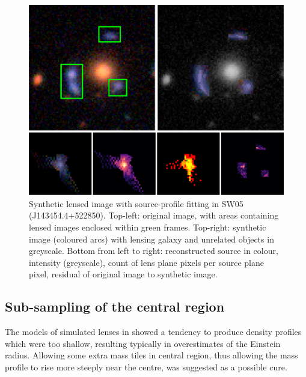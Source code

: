 \begin{figure}
  \includegraphics[width=\linewidth]{img/new_synth_img_detailed}
  \caption{Synthetic lensed image with source-profile fitting in SW05
    (J143454.4+522850). Top-left: original image, with areas
    containing lensed images enclosed within green frames.  Top-right:
    synthetic image (coloured arcs) with lensing galaxy and unrelated
    objects in greyscale.  Bottom from left to right: reconstructed
    source in colour, intensity (greyscale), count of lens plane
    pixels per source plane pixel, residual of original image to
    synthetic image.}
  \label{fig:synthimg}
\end{figure}

\subsection{Sub-sampling of the central region}\label{subsec:hires}

The models of simulated lenses in \cite{2015MNRAS.447.2170K} showed a
tendency to produce density profiles which were too shallow, resulting
typically in overestimates of the Einstein radius. Allowing some extra
mass tiles in central region, thus allowing the mass profile to rise
more steeply near the centre, was suggested as a possible cure.


